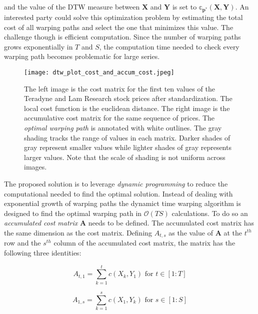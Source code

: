\documentclass[12pt]{article}
\begin{document}
and the value of the DTW measure between $\boldsymbol{X}$ and $\boldsymbol{Y}$ is set to $\mathbb{c}_{\boldsymbol{p^{*}}}(\boldsymbol{X}, \boldsymbol{Y})$. An interested party could solve this optimization problem by estimating the total cost of all warping paths and select the one that minimizes this value. The challenge though is efficient computation. Since the number of warping paths grows exponentially in $T$ and $S$, the computation time needed to check every warping path becomes problematic for large series.

\begin{figure}
    \centering
    \texttt{[image: dtw\_plot\_cost\_and\_accum\_cost.jpeg]}
    \caption{The left image is the cost matrix for the first ten values of the Teradyne and Lam Research stock prices after standardization. The local cost function is the euclidean distance. The right image is the accumulative cost matrix for the same sequence of prices. The \textit{optimal warping path} is annotated with white outlines. The gray shading tracks the range of values in each matrix. Darker shades of gray represent smaller values while lighter shades of gray represents larger values. Note that the scale of shading is not uniform across images.}
    \label{fig:dtw_plot_cost_and_accum_cost}
\end{figure}

The proposed solution is to leverage \emph{dynamic programming} to reduce the computational needed to find the optimal solution. Instead of dealing with exponential growth of warping paths the dynamict time warping algorithm is designed to find the optimal warping path in $\mathcal{O}(TS)$ calculations. To do so an \emph{accumulated cost matrix} $\boldsymbol{A}$ needs to be defined. The accumulated cost matrix has the same dimension as the cost matrix. Defining $A_{t,s}$ as the value of $\boldsymbol{A}$ at the $t^{th}$ row and the $s^{th}$ column of the accumulated cost matrix, the matrix has the following three identities:

\begin{equation} \label{eq:dtw_accum_cost_x_axis}
    A_{t,1} = \sum^{t}_{k=1} c(X_{k}, Y_{1}) \,\, \textrm{for} \,\, t \in [1:T]
\end{equation}

\begin{equation} \label{eq:dtw_accum_cost_y_axis}
    A_{1,s} = \sum^{s}_{k=1} c(X_{1}, Y_{k}) \,\, \textrm{for} \,\, s \in [1:S]
\end{equation}
\end{document}
